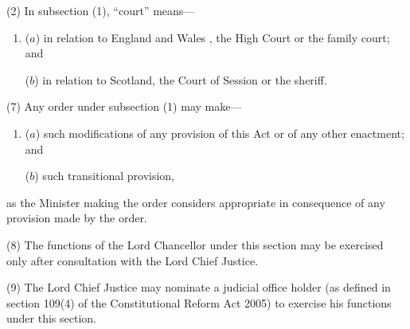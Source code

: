 \documentclass[a4paper]{article}
\begin{document}
(2) In subsection (1), “court” means---
\begin{enumerate}\item[]
($a$) in relation to England and Wales%
, the High Court or the family court; and  %

($b$) in relation to Scotland, the Court of Session or the sheriff.
\end{enumerate}

%
%
%

(7)
Any order under subsection (1) may make---
\begin{enumerate}\item[]
($a$) such modifications of any provision of this Act or of any other enactment; and

($b$) such transitional provision,
\end{enumerate}
as the Minister making the order considers appropriate in consequence of any provision made by the order.

(8) The functions of the Lord Chancellor under this section may be exercised only after consultation with the Lord Chief Justice.

(9) The Lord Chief Justice may nominate a judicial office holder (as defined in section 109(4) of the Constitutional Reform Act 2005) to exercise his functions under this section.
\end{document}
